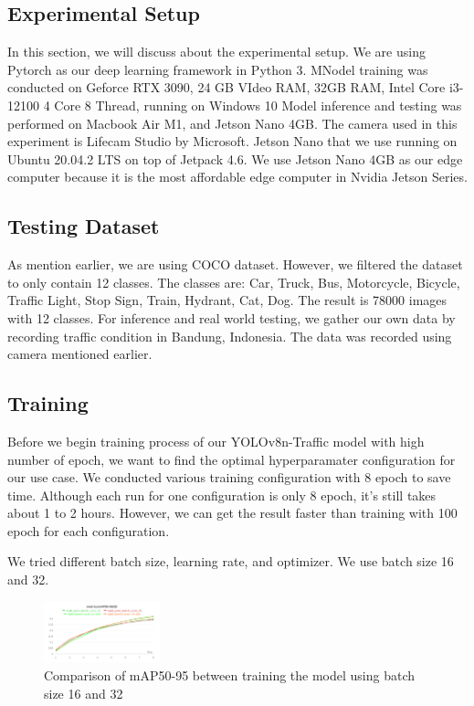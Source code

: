 \documentclass[conference]{IEEEtran}
\begin{document}
\subsection{Experimental Setup}
In this section, we will discuss about the experimental setup. We are using Pytorch as our deep learning framework in Python  3.
MNodel training was conducted on Geforce RTX 3090, 24 GB VIdeo RAM, 32GB RAM, Intel Core i3-12100 4 Core 8 Thread, running on Windows 10
Model inference and testing was performed on Macbook Air M1, and Jetson Nano 4GB. The camera used in this experiment is Lifecam Studio by Microsoft.
Jetson Nano that we use running on Ubuntu 20.04.2 LTS on top of Jetpack 4.6. We use Jetson Nano 4GB as our edge computer because it is the most affordable edge computer in Nvidia Jetson Series.
\subsection{Testing Dataset}
As mention earlier, we are using COCO dataset. However, we filtered the dataset to only contain 12 classes. The classes are:
Car, Truck, Bus, Motorcycle, Bicycle, Traffic Light, Stop Sign, Train, Hydrant, Cat, Dog. The result is 78000 images with 12 classes.
For inference and real world testing, we gather our own data by recording traffic condition in Bandung, Indonesia. The data was recorded using camera mentioned earlier.

\subsection{Training}
Before we begin training process of our YOLOv8n-Traffic model with high number of epoch, we want to find the optimal hyperparamater configuration for our use case. We conducted various training configuration with 8 epoch to save time.
Although each run for one configuration is only 8 epoch, it's still takes about 1 to 2 hours. However, we can get the result faster than training with 100 epoch for each configuration.

We tried different batch size, learning rate, and optimizer. We use batch size 16 and 32.
\begin{figure}[h]
\centering
\includegraphics[width=0.3\textwidth,keepaspectratio]{mAP_batch_size_comparison.png} %
\caption{Comparison of mAP50-95 between training the model using batch size 16 and 32}
\label{fig:batch_size}
\end{figure}
\end{document}
